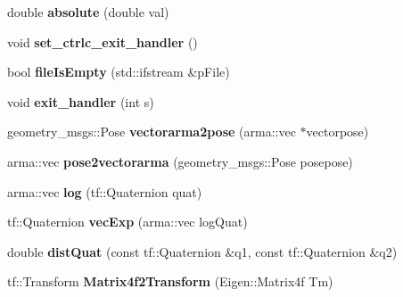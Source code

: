 \begin{DoxyCompactItemize}
\item 
double {\bfseries absolute} (double val)\hypertarget{namespacekukadu_adf087f4f1f69f316365a414842f51512}{}\label{namespacekukadu_adf087f4f1f69f316365a414842f51512}

\item 
void {\bfseries set\+\_\+ctrlc\+\_\+exit\+\_\+handler} ()\hypertarget{namespacekukadu_ad4e11f6abb484a595bba462ac88f9605}{}\label{namespacekukadu_ad4e11f6abb484a595bba462ac88f9605}

\item 
bool {\bfseries file\+Is\+Empty} (std\+::ifstream \&p\+File)\hypertarget{namespacekukadu_a0924c2b7068eaab885e2cb371d79b888}{}\label{namespacekukadu_a0924c2b7068eaab885e2cb371d79b888}

\item 
void {\bfseries exit\+\_\+handler} (int s)\hypertarget{namespacekukadu_a0f5a68a4b2aefd3d894a0235664ac5e5}{}\label{namespacekukadu_a0f5a68a4b2aefd3d894a0235664ac5e5}

\item 
geometry\+\_\+msgs\+::\+Pose {\bfseries vectorarma2pose} (arma\+::vec $\ast$vectorpose)\hypertarget{namespacekukadu_af4b115434fc557d1a59c92930043bf99}{}\label{namespacekukadu_af4b115434fc557d1a59c92930043bf99}

\item 
arma\+::vec {\bfseries pose2vectorarma} (geometry\+\_\+msgs\+::\+Pose posepose)\hypertarget{namespacekukadu_a5d082f90195542c29ee20a98405dbe31}{}\label{namespacekukadu_a5d082f90195542c29ee20a98405dbe31}

\item 
arma\+::vec {\bfseries log} (tf\+::\+Quaternion quat)\hypertarget{namespacekukadu_afa6b425e55df9de457d99c40faad535d}{}\label{namespacekukadu_afa6b425e55df9de457d99c40faad535d}

\item 
tf\+::\+Quaternion {\bfseries vec\+Exp} (arma\+::vec log\+Quat)\hypertarget{namespacekukadu_a537c94326e5aafb4c5199c7026155621}{}\label{namespacekukadu_a537c94326e5aafb4c5199c7026155621}

\item 
double {\bfseries dist\+Quat} (const tf\+::\+Quaternion \&q1, const tf\+::\+Quaternion \&q2)\hypertarget{namespacekukadu_a1a5a9cea0d7b5a8c62c49cb720fbdb9e}{}\label{namespacekukadu_a1a5a9cea0d7b5a8c62c49cb720fbdb9e}

\item 
tf\+::\+Transform {\bfseries Matrix4f2\+Transform} (Eigen\+::\+Matrix4f Tm)\hypertarget{namespacekukadu_acf90cbb6df534c52bb47691360c3fad3}{}\label{namespacekukadu_acf90cbb6df534c52bb47691360c3fad3}


\end{DoxyCompactItemize}
